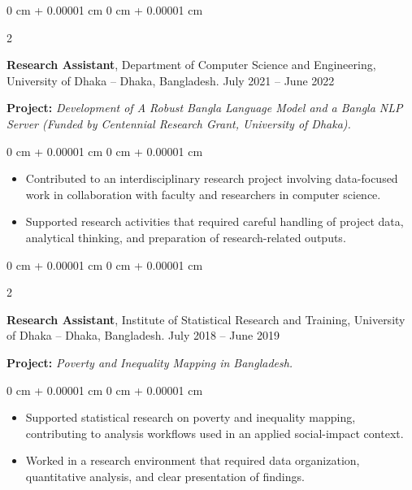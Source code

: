 \documentclass[10pt, letterpaper]{article}
\newenvironment{highlights}{
    \begin{itemize}[
        topsep=0.10 cm,
        parsep=0.10 cm,
        partopsep=0pt,
        itemsep=0pt,
        leftmargin=0 cm + 10pt
    ]
}{
    \end{itemize}
} %
\newenvironment{onecolentry}{
    \begin{adjustwidth}{
        0 cm + 0.00001 cm
    }{
        0 cm + 0.00001 cm
    }
}{
    \end{adjustwidth}
} %
\newenvironment{twocolentry}[2][]{
    \onecolentry
    \def\secondColumn{#2}
    \setcolumnwidth{\fill, 4.5 cm}
    \begin{paracol}{2}
}{
    \switchcolumn \raggedleft \secondColumn
    \end{paracol}
    \endonecolentry
} %
\begin{document}
   \begin{twocolentry}{
            July 2021 -- June 2022
        }
            \textbf{Research Assistant}, Department of Computer Science and Engineering, University of Dhaka -- Dhaka, Bangladesh.\end{twocolentry} 

    \textbf{Project: }\textit{Development of A Robust Bangla Language Model and a Bangla NLP Server (Funded by Centennial Research Grant, University of Dhaka).}\\
    \begin{onecolentry}
        \begin{highlights}
            \item Contributed to an interdisciplinary research project involving data-focused work in collaboration with faculty and researchers in computer science.
            \item Supported research activities that required careful handling of project data, analytical thinking, and preparation of research-related outputs.
        \end{highlights}
    \end{onecolentry}

    \begin{twocolentry}{
            July 2018 -- June 2019
        }
            \textbf{Research Assistant}, Institute of Statistical Research and Training, University of Dhaka -- Dhaka, Bangladesh.\end{twocolentry} 
            \textbf{Project: }\textit{Poverty and Inequality Mapping in Bangladesh.}\\
    \begin{onecolentry}
        \begin{highlights}
            \item Supported statistical research on poverty and inequality mapping, contributing to analysis workflows used in an applied social-impact context.
            \item Worked in a research environment that required data organization, quantitative analysis, and clear presentation of findings.
        \end{highlights}
    \end{onecolentry}
       
\end{document}
